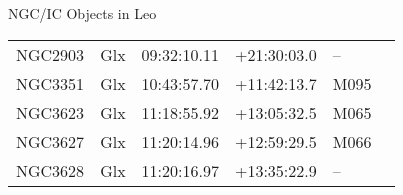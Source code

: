 \begin{block}{NGC/IC Objects in Leo}
  \centering
  \begin{tabularx}{\textwidth}{llrrll} 
    NGC2903 & Glx & 09:32:10.11 & +21:30:03.0  & -- \\ 
    NGC3351 & Glx & 10:43:57.70 & +11:42:13.7  & M095 \\ 
    NGC3623 & Glx & 11:18:55.92 & +13:05:32.5  & M065 \\ 
    NGC3627 & Glx & 11:20:14.96 & +12:59:29.5  & M066 \\ 
    NGC3628 & Glx & 11:20:16.97 & +13:35:22.9  & -- \\ 
  \end{tabularx}
\end{block}